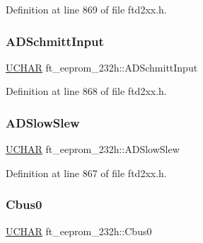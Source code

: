 Definition at line 869 of file ftd2xx.\+h.

\mbox{\label{structft__eeprom__232h_a9d6cc1ae3e56bad64ba55a3db9cd845c}} 
\subsubsection{\texorpdfstring{A\+D\+Schmitt\+Input}{ADSchmittInput}}
{\footnotesize\ttfamily \hyperlink{CatCaloProto40MHz_2inc_2WinTypes_8h_a4f4bb67531a9bf6f0b9c6ad76aeba587}{U\+C\+H\+AR} ft\+\_\+eeprom\+\_\+232h\+::\+A\+D\+Schmitt\+Input}



Definition at line 868 of file ftd2xx.\+h.

\mbox{\label{structft__eeprom__232h_a192cf979058aac20dbea8840a35f1bae}} 
\subsubsection{\texorpdfstring{A\+D\+Slow\+Slew}{ADSlowSlew}}
{\footnotesize\ttfamily \hyperlink{CatCaloProto40MHz_2inc_2WinTypes_8h_a4f4bb67531a9bf6f0b9c6ad76aeba587}{U\+C\+H\+AR} ft\+\_\+eeprom\+\_\+232h\+::\+A\+D\+Slow\+Slew}



Definition at line 867 of file ftd2xx.\+h.

\mbox{\label{structft__eeprom__232h_aac7c9328aa4b74813b1fbd73a0a6afbd}} 
\subsubsection{\texorpdfstring{Cbus0}{Cbus0}}
{\footnotesize\ttfamily \hyperlink{CatCaloProto40MHz_2inc_2WinTypes_8h_a4f4bb67531a9bf6f0b9c6ad76aeba587}{U\+C\+H\+AR} ft\+\_\+eeprom\+\_\+232h\+::\+Cbus0}



